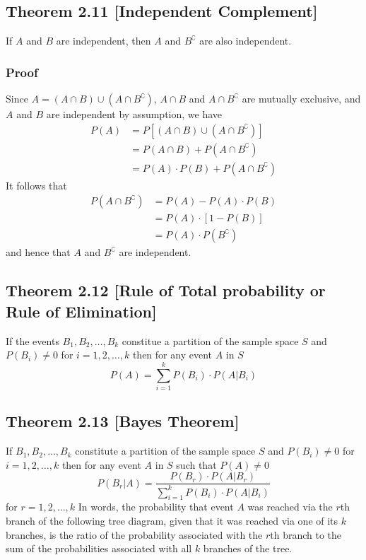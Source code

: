 \documentclass{article}
\begin{document}
\subsection*{Theorem 2.11 [Independent Complement]}
If \(A\) and \(B\) are independent, then \(A\) and \(B^\complement\) are also independent.

\subsubsection*{Proof}
Since \(A = (A \cap B) \cup (A \cap B^\complement)\), \(A \cap B\) and \(A \cap B^\complement\) are mutually exclusive, and \(A\) and \(B\) are independent by assumption, we have 
\begin{align*}
P(A) &= P[(A \cap B) \cup (A \cap B^\complement)]\\
&= P(A \cap B) + P(A \cap B^\complement)\\
&= P(A) \cdot P(B) + P(A \cap B^\complement)
\end{align*}
It follows that 
\begin{align*}
P(A \cap B^\complement) &= P(A) - P(A) \cdot P(B)\\
&= P(A) \cdot [1 - P(B)]\\
&= P(A) \cdot P(B^\complement)
\end{align*}
and hence that \(A\) and \(B^\complement\) are independent.

\subsection*{Theorem 2.12 [Rule of Total probability or Rule of Elimination]}
If the events \(B_1, B_2, \ldots, B_k\) constitue a partition of the sample space \(S\) and \(P(B_i) \ne 0\) for \(i=1,2,\ldots,k\) then for any event \(A\) in \(S\)
\[
P(A) = \sum_{i=1}^k P(B_i) \cdot P(A|B_i)
\]

\subsection*{Theorem 2.13 [Bayes Theorem]}
If  \(B_1, B_2, \ldots, B_k\) constitute a partition of the sample space \(S\) and \(P(B_i) \ne 0\) for \(i=1,2,\ldots,k\) then for any event \(A\) in \(S\) such that \(P(A) \ne 0\)
\[
P(B_r|A) = \frac{P(B_r) \cdot P(A|B_r)}{\sum_{i=1}^k P(B_i) \cdot P(A|B_i)}
\]
for \(r = 1,2,\ldots,k\)
In words, the probability that event \(A\) was reached via the \(r\)th branch of the following tree diagram, given that it was reached via one of its \(k\) branches, is the ratio of the probability associated with the \(r\)th branch to the sum of the probabilities associated with all \(k\) branches of the tree.
\end{document}
